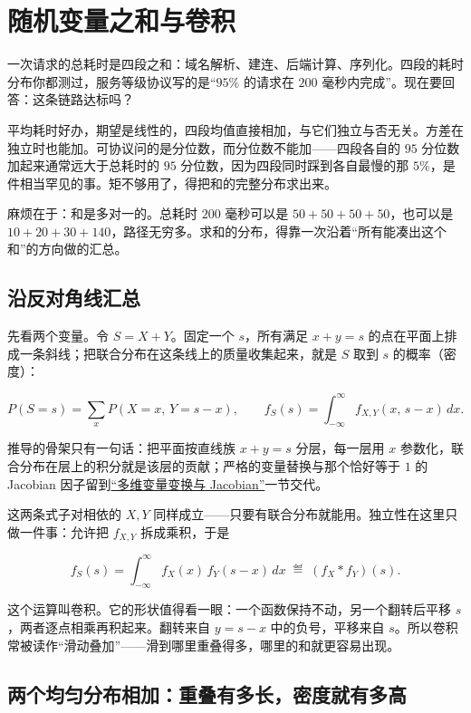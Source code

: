 \section{随机变量之和与卷积}
\label{sec:05-Probability/05-Joint-Distributions/03}

一次请求的总耗时是四段之和：域名解析、建连、后端计算、序列化。四段的耗时分布你都测过，服务等级协议写的是``\(95\%\) 的请求在 \(200\) 毫秒内完成''。现在要回答：这条链路达标吗？

平均耗时好办，期望是线性的，四段均值直接相加，与它们独立与否无关。方差在独立时也能加。可协议问的是分位数，而分位数不能加——四段各自的 \(95\) 分位数加起来通常远大于总耗时的 \(95\) 分位数，因为四段同时踩到各自最慢的那 \(5\%\)，是件相当罕见的事。矩不够用了，得把和的完整分布求出来。

麻烦在于：和是多对一的。总耗时 \(200\) 毫秒可以是 \(50+50+50+50\)，也可以是 \(10+20+30+140\)，路径无穷多。求和的分布，得靠一次沿着``所有能凑出这个和''的方向做的汇总。

\subsection{沿反对角线汇总}

先看两个变量。令 \(S=X+Y\)。固定一个 \(s\)，所有满足 \(x+y=s\) 的点在平面上排成一条斜线；把联合分布在这条线上的质量收集起来，就是 \(S\) 取到 \(s\) 的概率（密度）：

\[
P(S=s)=\sum_x P(X=x,\,Y=s-x),
\qquad
f_S(s)=\int_{-\infty}^{\infty} f_{X,Y}(x,\,s-x)\,dx.
\]

推导的骨架只有一句话：把平面按直线族 \(x+y=s\) 分层，每一层用 \(x\) 参数化，联合分布在层上的积分就是该层的贡献；严格的变量替换与那个恰好等于 \(1\) 的 Jacobian 因子留到\hyperref[sec:05-Probability/05-Joint-Distributions/05]{``多维变量变换与 Jacobian''}一节交代。

这两条式子对相依的 \(X,Y\) 同样成立——只要有联合分布就能用。独立性在这里只做一件事：允许把 \(f_{X,Y}\) 拆成乘积，于是

\[
f_S(s)=\int_{-\infty}^{\infty} f_X(x)\,f_Y(s-x)\,dx
\;\eqdef\; (f_X*f_Y)(s).
\]

这个运算叫卷积。它的形状值得看一眼：一个函数保持不动，另一个翻转后平移 \(s\)，两者逐点相乘再积起来。翻转来自 \(y=s-x\) 中的负号，平移来自 \(s\)。所以卷积常被读作``滑动叠加''——滑到哪里重叠得多，哪里的和就更容易出现。

\subsection{两个均匀分布相加：重叠有多长，密度就有多高}

